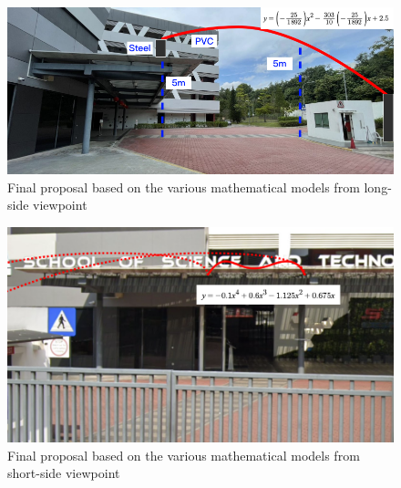\documentclass[a4paper,titlepage]{article}
\begin{document}
\begin{figure}[htbp]
    \centering
    \includegraphics[width=\textwidth]{finalLongSide.png}
    \caption{Final proposal based on the various mathematical models from long-side viewpoint}
    \label{fig:finalLongSide}
\end{figure}

\begin{figure}[htbp]
    \centering
    \includegraphics[width=\textwidth]{finalShortSide.png}
    \caption{Final proposal based on the various mathematical models from short-side viewpoint}
    \label{fig:finalShortSide}
\end{figure}

\pagebreak


\end{document}

